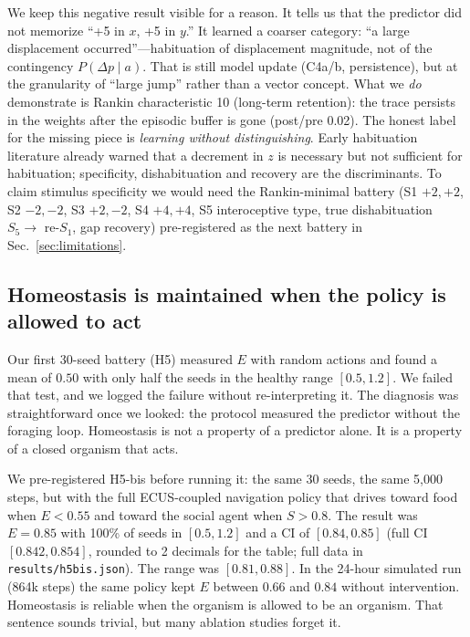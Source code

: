 \documentclass[11pt,a4paper]{article}
\begin{document}
We keep this negative result visible for a reason. It tells us that the predictor did not memorize ``+5 in $x$, +5 in $y$.'' It learned a coarser category: ``a large displacement occurred''---habituation of displacement magnitude, not of the contingency $P(\Delta p\mid a)$. That is still model update (C4a/b, persistence), but at the granularity of ``large jump'' rather than a vector concept. What we \textit{do} demonstrate is Rankin characteristic 10 (long-term retention): the trace persists in the weights after the episodic buffer is gone (post/pre 0.02). The honest label for the missing piece is \textit{learning without distinguishing}. Early habituation literature already warned that a decrement in $z$ is necessary but not sufficient for habituation; specificity, dishabituation and recovery are the discriminants. To claim stimulus specificity we would need the Rankin-minimal battery (S1 $+2,+2$, S2 $-2,-2$, S3 $+2,-2$, S4 $+4,+4$, S5 interoceptive type, true dishabituation $S_5\rightarrow$ re-$S_1$, gap recovery) pre-registered as the next battery in Sec.~\ref{sec:limitations}.

\subsection{Homeostasis is maintained when the policy is allowed to act}

Our first 30-seed battery (H5) measured $E$ with random actions and found a mean of $0.50$ with only half the seeds in the healthy range $[0.5, 1.2]$. We failed that test, and we logged the failure without re-interpreting it. The diagnosis was straightforward once we looked: the protocol measured the predictor without the foraging loop. Homeostasis is not a property of a predictor alone. It is a property of a closed organism that acts.

We pre-registered H5-bis before running it: the same 30 seeds, the same 5,000 steps, but with the full ECUS-coupled navigation policy that drives toward food when $E<0.55$ and toward the social agent when $S>0.8$. The result was $E=0.85$ with 100\% of seeds in $[0.5,1.2]$ and a CI of $[0.84,0.85]$ (full CI $[0.842,0.854]$, rounded to 2 decimals for the table; full data in \texttt{results/h5bis.json}). The range was $[0.81,0.88]$. In the 24-hour simulated run (864k steps) the same policy kept $E$ between $0.66$ and $0.84$ without intervention. Homeostasis is reliable when the organism is allowed to be an organism. That sentence sounds trivial, but many ablation studies forget it.
\end{document}
